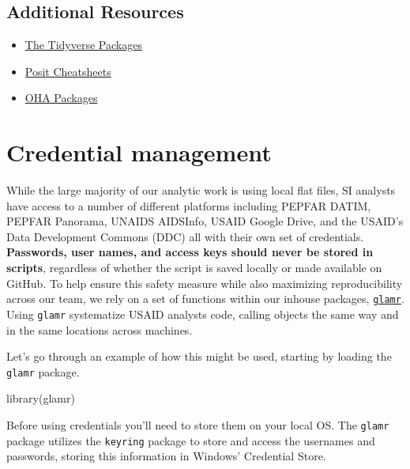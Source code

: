\documentclass[
  letterpaper,
  DIV=11,
  numbers=noendperiod]{scrreprt}
\newenvironment{Shaded}{\begin{snugshade}}{\end{snugshade}}
\newcommand{\FunctionTok}[1]{\textcolor[rgb]{0.28,0.35,0.67}{#1}}
\newcommand{\NormalTok}[1]{\textcolor[rgb]{0.00,0.23,0.31}{#1}}
\providecommand{\tightlist}{%
  \setlength{\itemsep}{0pt}\setlength{\parskip}{0pt}}\usepackage{longtable,booktabs,array}
\begin{document}
\hypertarget{additional-resources-2}{%
\section{Additional Resources}\label{additional-resources-2}}

\begin{itemize}
\tightlist
\item
  \href{https://www.tidyverse.org/}{The Tidyverse Packages}
\item
  \href{https://posit.co/resources/cheatsheets/}{Posit Cheatsheets}
\item
  \href{https://usaid-oha-si.github.io/tools/}{OHA Packages}
\end{itemize}

\hypertarget{credential-management}{%
\chapter{Credential management}\label{credential-management}}

While the large majority of our analytic work is using local flat files,
SI analysts have access to a number of different platforms including
PEPFAR DATIM, PEPFAR Panorama, UNAIDS AIDSInfo, USAID Google Drive, and
the USAID's Data Development Commons (DDC) all with their own set of
credentials. \textbf{Passwords, user names, and access keys should never
be stored in scripts}, regardless of whether the script is saved locally
or made available on GitHub. To help ensure this safety measure while
also maximizing reproducibility across our team, we rely on a set of
functions within our inhouse packages,
\href{https://usaid-oha-si.github.io/glamr/}{\texttt{glamr}}. Using
\texttt{glamr} systematize USAID analysts code, calling objects the same
way and in the same locations across machines.

Let's go through an example of how this might be used, starting by
loading the \texttt{glamr} package.

\begin{Shaded}
\begin{Highlighting}[]
\FunctionTok{library}\NormalTok{(glamr)}
\end{Highlighting}
\end{Shaded}

Before using credentials you'll need to store them on your local OS. The
\texttt{glamr} package utilizes the \texttt{keyring} package to store
and access the usernames and passwords, storing this information in
Windows' Credential Store.
\end{document}
